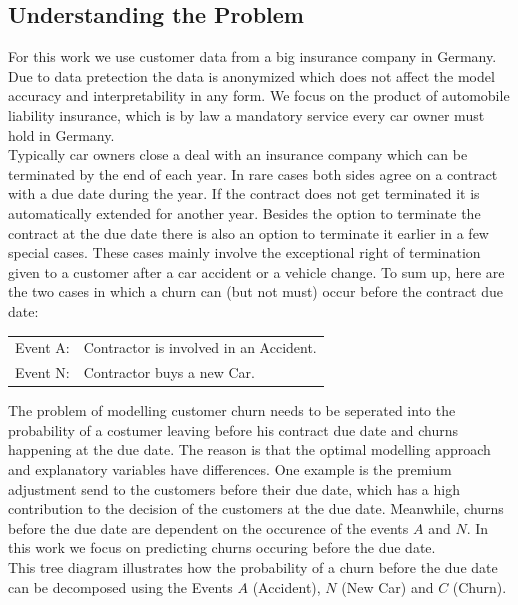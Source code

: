 \documentclass[12pt,titlepage]{article}
\begin{document}
\subsection{Understanding the Problem} \par

For this work we use customer data from a big insurance company in Germany. Due to data pretection the data is anonymized which does not affect the model accuracy and interpretability in any form. We focus on the product of automobile liability insurance, which is by law a mandatory service every car owner must hold in Germany. \\
Typically car owners close a deal with an insurance company which can be terminated by the end of each year. In rare cases both sides agree on a contract with a due date during the year. If the contract does not get terminated it is automatically extended for another year. Besides the option to terminate the contract at the due date there is also an option to terminate it earlier in a few special cases. These cases mainly involve the exceptional right of termination given to a customer after a car accident or a vehicle change. To sum up, here are the two cases in which a churn can (but not must) occur before the contract due date: \\

\begin{center}
    \begin{tabular}{ll}
        Event A: & Contractor is involved in an Accident. \\
        Event N: & Contractor buys a new Car. \\
    \end{tabular}
\end{center}

The problem of modelling customer churn needs to be seperated into the probability of a costumer leaving before his contract due date and churns happening at the due date. The reason is that the optimal modelling approach and explanatory variables have differences. One example is the premium adjustment send to the customers before their due date, which has a high contribution to the decision of the customers at the due date. Meanwhile, churns before the due date are dependent on the occurence of the events $A$ and $N$. In this work we focus on predicting churns occuring before the due date. \\
This tree diagram illustrates how the probability of a churn before the due date can be decomposed using the Events $A$ (Accident), $N$ (New Car) and $C$ (Churn). \\
\end{document}

